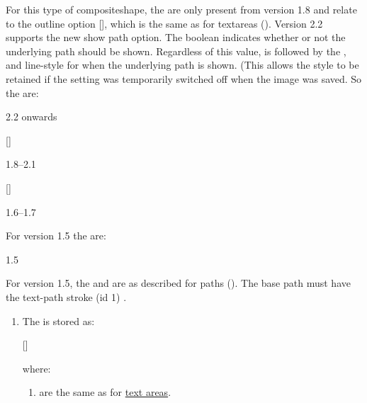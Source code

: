 \begin{numbered}
\begin{enumerate}
  For this type of \gls{compositeshape}, the  are only
  present from version 1.8 and relate to the outline option
   [], which is
  the same as for \glspl*{textarea} (\hyperref[jdr:textarea]{}).
  Version 2.2 supports the new show path option. The boolean
   indicates whether or not the underlying path
  should be shown. Regardless of this value, 
  is followed by the , 
  and \gls{line-style} for when the underlying path is shown.
  (This allows the style to be retained if the setting was temporarily 
  switched off when the image was saved.
  So the  are:
  \begin{jdrversion}{2.2 onwards}
  \begin{syntaxline}
   [] 
     
  \end{syntaxline}
  \end{jdrversion}
  \begin{jdrversion}{1.8--2.1}
  \begin{syntaxline}
   [] 
  \end{syntaxline}
  \end{jdrversion}
  \begin{jdrversion}{1.6--1.7}
  \begin{syntaxline}
  \end{syntaxline}
  \end{jdrversion}

  For version 1.5 the  are:
  \begin{jdrversion}{1.5}
  \begin{syntaxline}
    
  \end{syntaxline}
  For version 1.5, the  and  are as described
  for paths (\hyperref[jdr:path]{}). The base path must have the
  text-path stroke (id 1) \hyperref[jdr:pathstyle]{}.
  \end{jdrversion}

    \begin{enumerate}%

    \item\label{jdr:textpathstroke} The  is
    stored as:
    \begin{syntaxline}
      
    [] 
    \end{syntaxline}
    where:
      \begin{enumerate}
      \item {} are the same as for
      \hyperref[jdr:textarea]{text areas}.


\end{enumerate}
\end{enumerate}
\end{enumerate}
\end{numbered}
